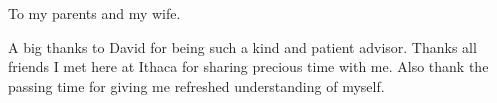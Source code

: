 \documentclass[phd,tocprelim]{cornell}
\begin{document}
\begin{dedication}
To my parents and my wife.
\end{dedication}

\begin{acknowledgements}
A big thanks to David for being such a kind and patient advisor. Thanks all friends I met here at Ithaca for sharing precious time with me. Also thank the passing time for giving me refreshed understanding of myself.
\end{acknowledgements}

\contentspage
\tablelistpage
\figurelistpage

\normalspacing \setcounter{page}{1} 
\pagestyle{cornell} \addtolength{\parskip}{0.5\baselineskip}

%
%

%
%


\end{document}
